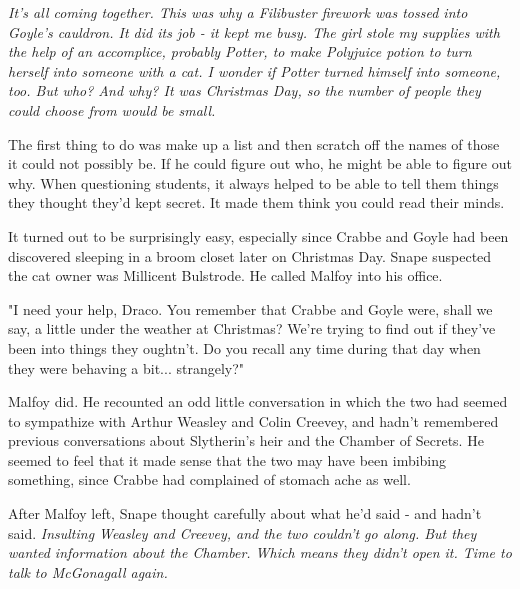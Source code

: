 \documentclass[a4paper,11pt]{article}
\begin{document}
\emph{It's all coming together. This was why a Filibuster firework was tossed into Goyle's cauldron. It did its job - it kept me busy. The girl stole my supplies with the help of an accomplice, probably Potter, to make Polyjuice potion to turn herself into someone with a cat. I wonder if Potter turned himself into someone, too. But who? And why? It was Christmas Day, so the number of people they could choose from would be small.}

The first thing to do was make up a list and then scratch off the names of those it could not possibly be. If he could figure out who, he might be able to figure out why. When questioning students, it always helped to be able to tell them things they thought they'd kept secret. It made them think you could read their minds.

It turned out to be surprisingly easy, especially since Crabbe and Goyle had been discovered sleeping in a broom closet later on Christmas Day. Snape suspected the cat owner was Millicent Bulstrode. He called Malfoy into his office.

"I need your help, Draco. You remember that Crabbe and Goyle were, shall we say, a little under the weather at Christmas? We're trying to find out if they've been into things they oughtn't. Do you recall any time during that day when they were behaving a bit... strangely?"

Malfoy did. He recounted an odd little conversation in which the two had seemed to sympathize with Arthur Weasley and Colin Creevey, and hadn't remembered previous conversations about Slytherin's heir and the Chamber of Secrets. He seemed to feel that it made sense that the two may have been imbibing something, since Crabbe had complained of stomach ache as well.

After Malfoy left, Snape thought carefully about what he'd said - and hadn't said. \emph{Insulting Weasley and Creevey, and the two couldn't go along. But they wanted information about the Chamber. Which means they didn't open it. Time to talk to McGonagall again.}
\end{document}
